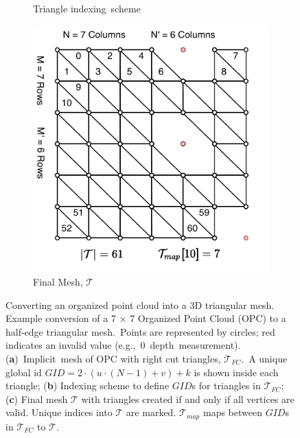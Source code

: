 \begin{figure}[H]
\begin{subfigure}[t]{.33\linewidth}
    \caption{\label{fig:ch3_OPC_HE} Triangle indexing~scheme}\vspace{6pt}
  \end{subfigure}
  \begin{subfigure}[t]{.33\linewidth}
     \centering\includegraphics[width=.95\linewidth]{chapter_3_polylidar3d/imgs/OPCHalfEdge-OPC-Mesh_actual_V2.pdf}
    \caption{\label{fig:ch3_OPC_Mesh} Final Mesh, $\mathcal{T}$ }\vspace{6pt}
  \end{subfigure}
  \caption[Converting an organized point cloud into a 3D triangular mesh]{Converting an organized point cloud into a 3D triangular mesh. Example conversion of a 7 $\times$ 7 Organized Point Cloud (OPC) to a half-edge triangular mesh.~Points are represented by circles; red indicates an invalid value (e.g.,~0~depth~measurement). (\textbf{a})~Implicit~mesh of \ac{OPC} with right cut triangles, $\mathcal{T}_{FC}$.~A unique global id $GID = 2 \cdot (u \cdot (N-1) + v) + k$ is shown inside each triangle;  (\textbf{b}) Indexing scheme to define $GID$s for triangles in $\mathcal{T}_{FC}$; (\textbf{c}) Final mesh $\mathcal{T}$ with triangles created if and only if all vertices are valid. Unique indices into $\mathcal{T}$  are marked.  $\mathcal{T}_{map}$ maps between $GID$s in $\mathcal{T}_{FC}$ to $\mathcal{T}$. }\label{fig:ch3_OPC_Mesh_all}
\end{figure}
